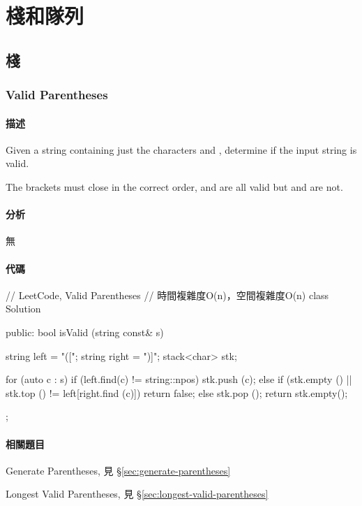 \chapter{棧和隊列}


\section{棧} %


\subsection{Valid Parentheses} %
\label{sec:valid-parentheses}


\subsubsection{描述}
Given a string containing just the characters \code{'(', ')', '\{', '\}', '['} and \code{']'}, determine if the input string is valid.

The brackets must close in the correct order,  and  are all valid but \code{"(]"} and  are not.


\subsubsection{分析}
無


\subsubsection{代碼}
\begin{Code}
// LeetCode, Valid Parentheses
// 時間複雜度O(n)，空間複雜度O(n)
class Solution {
public:
    bool isValid (string const& s) {
        string left = "([{";
        string right = ")]}";
        stack<char> stk;

        for (auto c : s) {
            if (left.find(c) != string::npos) {
                stk.push (c);
            } else {
                if (stk.empty () || stk.top () != left[right.find (c)])
                    return false;
                else
                    stk.pop ();
            }
        }
        return stk.empty();
    }
};
\end{Code}


\subsubsection{相關題目}
\begindot
\item Generate Parentheses, 見 \S \ref{sec:generate-parentheses}
\item Longest Valid Parentheses, 見 \S \ref{sec:longest-valid-parentheses}
\myenddot



